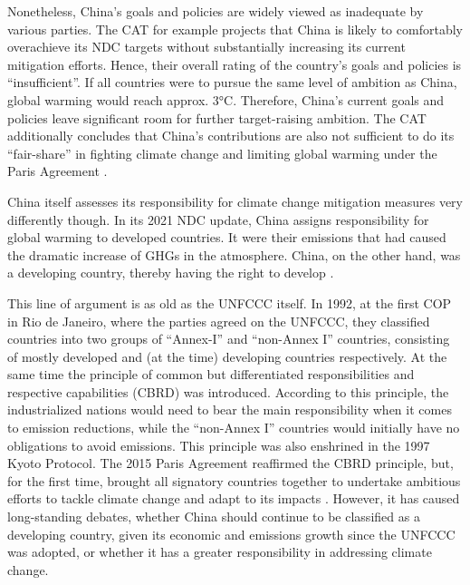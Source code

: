\documentclass[
  12pt,
]{article}
\numberwithin{equation}{section}
\numberwithin{table}{section}
\numberwithin{figure}{section}
\begin{document}
Nonetheless, China's goals and policies are widely viewed as inadequate
by various parties. The CAT for example projects that China is likely to
comfortably overachieve its NDC targets without substantially increasing
its current mitigation efforts. Hence, their overall rating of the
country's goals and policies is ``insufficient''. If all countries were
to pursue the same level of ambition as China, global warming would
reach approx. 3°C. Therefore, China's current goals and policies leave
significant room for further target-raising ambition. The CAT
additionally concludes that China's contributions are also not
sufficient to do its ``fair-share'' in fighting climate change and
limiting global warming under the Paris Agreement \citep{CAT2022}.

China itself assesses its responsibility for climate change mitigation
measures very differently though. In its 2021 NDC update, China assigns
responsibility for global warming to developed countries. It were their
emissions that had caused the dramatic increase of GHGs in the
atmosphere. China, on the other hand, was a developing country, thereby
having the right to develop \citep{China2021}.

This line of argument is as old as the UNFCCC itself. In 1992, at the
first COP in Rio de Janeiro, where the parties agreed on the UNFCCC,
they classified countries into two groups of ``Annex-I'' and ``non-Annex
I'' countries, consisting of mostly developed and (at the time)
developing countries respectively. At the same time the principle of
common but differentiated responsibilities and respective capabilities
(CBRD) was introduced. According to this principle, the industrialized
nations would need to bear the main responsibility when it comes to
emission reductions, while the ``non-Annex I'' countries would initially
have no obligations to avoid emissions. This principle was also
enshrined in the 1997 Kyoto Protocol. The 2015 Paris Agreement
reaffirmed the CBRD principle, but, for the first time, brought all
signatory countries together to undertake ambitious efforts to tackle
climate change and adapt to its impacts \citep{UNFCCC2015}. However, it
has caused long-standing debates, whether China should continue to be
classified as a developing country, given its economic and emissions
growth since the UNFCCC was adopted, or whether it has a greater
responsibility in addressing climate change.
\end{document}
